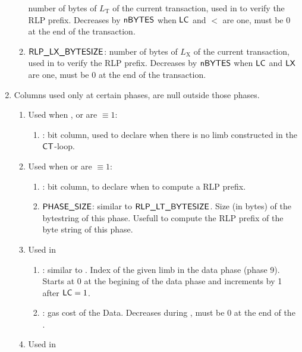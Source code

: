\begin{enumerate}
\begin{enumerate}
                number of bytes of $L_{\mathrm{T}}$ of the current transaction, used in \phaseRlpPrefix{} to verify the RLP prefix. Decreases by $\textsf{nBYTES}$ when $\textsf{LC}$ and $\lt$ are one, must be 0 at the end of the transaction.
            \item $\textsf{RLP\_LX\_BYTESIZE}$:
                number of bytes of $L_{\mathrm{X}}$ of the current transaction, used in \phaseRlpPrefix{} to verify the RLP prefix. Decreases by $\textsf{nBYTES}$ when $\textsf{LC}$ and $\textsf{LX}$ are one, must be 0 at the end of the transaction.
        \end{enumerate}
    \item Columns used only at certain phases, are null outside those phases.
        \begin{enumerate}
            \item Used when \phaseRlpPrefix{}, \phaseData{} or \phaseBeta{} are $\equiv 1$:
                \begin{enumerate}
                    \item \ispadding:
                        bit column, used to declare when there is no limb constructed in the $\textsf{CT}$-loop.
                \end{enumerate}
            \item Used when \phaseData{} or \phaseAccessList{} are $\equiv 1$:
                \begin{enumerate}
                    \item \isprefix:
                        bit column, to declare when to compute a RLP prefix.
                    \item $\textsf{PHASE\_SIZE}$:
                        similar to $\textsf{RLP\_LT\_BYTESIZE}$. Size (in bytes) of the bytestring of this phase. Usefull to compute the RLP prefix of the byte string of this phase.
                \end{enumerate}
            \item Used in \phaseData{}
                \begin{enumerate}
                    \item \indexData{}:
                        similar to \index. Index of the given limb in the data phase (phase 9). Starts at 0 at the begining of the data phase and increments by 1 after $\textsf{LC} = 1$.
                    \item \dataGasCost{}:
                        gas cost of the Data. Decreases during , must be 0 at the end of the .
                \end{enumerate}
            \item Used in \phaseAccessList{} 

\end{enumerate}
\end{enumerate}
